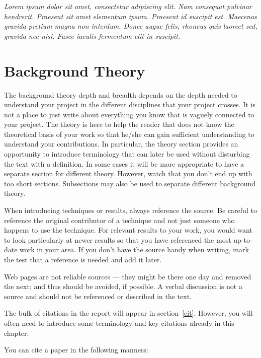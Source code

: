 \documentclass[a4paper]{book}
\begin{document}
{\it Lorem ipsum dolor sit amet, consectetur adipiscing elit. Nam consequat pulvinar hendrerit. Praesent sit amet elementum ipsum. Praesent id suscipit est. Maecenas gravida pretium magna non interdum. Donec augue felis, rhoncus quis laoreet sed, gravida nec nisi. Fusce iaculis fermentum elit in suscipit.}


\section{Background Theory}
\label{sec:no1}

The background theory depth and breadth depends on the depth needed to understand your project in the different disciplines that your project crosses.  It is not a place to just write about everything you know that is vaguely connected to your project. The theory is here to help the reader that does not know the theoretical basis of your work so that he/she can gain sufficient understanding to understand your contributions. In particular, the theory section provides an opportunity to introduce terminology that can later be used without disturbing the text with a definition.  In some cases it will be more appropriate to have a separate section for different theory. However, watch that you don't end up with too short sections. Subsections may also be used to separate different background theory.

When introducing techniques or results, always reference the source. Be careful to reference the original contributor of a technique and not just someone who happens to use the technique. For relevant results to your work, you would want to look particularly at newer results so that you have referenced the most up-to-date work in your area. If you don't have the source handy when writing, mark the test that a reference is needed and add it later.

Web pages are not reliable sources --- they might be there one day and removed the next; and thus should be avoided, if possible. A verbal discussion is not a source and should not be referenced or described in the text.

The bulk of citations in the report will appear in section~\ref{cit}. However, you will often need to introduce some terminology and key citations already in this chapter.

You can cite a paper in the following manners:
\end{document}
